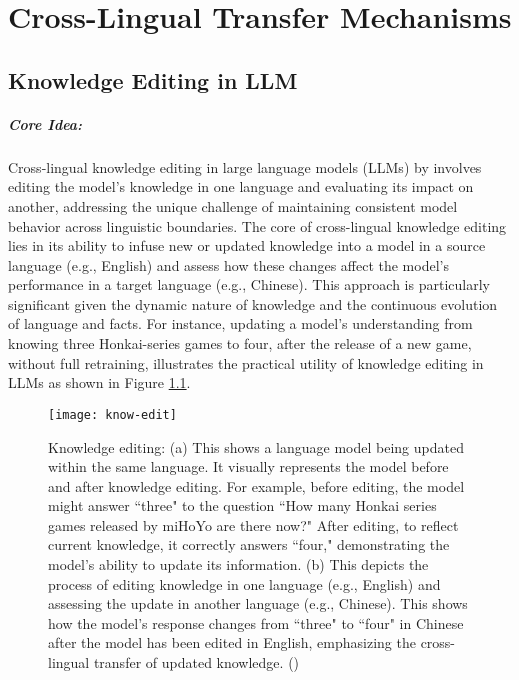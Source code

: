 \chapter{Cross-Lingual Transfer Mechanisms}\label{chp:Transfer}
\section{Knowledge Editing in LLM}
\paragraph{Core Idea:} Cross-lingual knowledge editing in large language models (LLMs) by \citet{wang2023crosslingual} involves editing the model's knowledge in one language and evaluating its impact on another, addressing the unique challenge of maintaining consistent model behavior across linguistic boundaries. The core of cross-lingual knowledge editing lies in its ability to infuse new or updated knowledge into a model in a source language (e.g., English) and assess how these changes affect the model's performance in a target language (e.g., Chinese). This approach is particularly significant given the dynamic nature of knowledge and the continuous evolution of language and facts. For instance, updating a model's understanding from knowing three Honkai-series games to four, after the release of a new game, without full retraining, illustrates the practical utility of knowledge editing in LLMs as shown in Figure \ref{fig: know-edit}.

\begin{figure}[tbh]
	\centering
	\texttt{[image: know-edit]}
	\caption[Mono-lingual and Cross-lingual knowledge editing]{Knowledge editing: (a) This shows a language model being updated within the same language. It visually represents the model before and after knowledge editing. For example, before editing, the model might answer ``three" to the question ``How many Honkai series games released by miHoYo are there now?" After editing, to reflect current knowledge, it correctly answers ``four," demonstrating the model's ability to update its information. (b) This depicts the process of editing knowledge in one language (e.g., English) and assessing the update in another language (e.g., Chinese). This shows how the model's response changes from ``three" to ``four" in Chinese after the model has been edited in English, emphasizing the cross-lingual transfer of updated knowledge. (\citet{wang2023crosslingual})}
	\label{fig: know-edit}
\end{figure}

